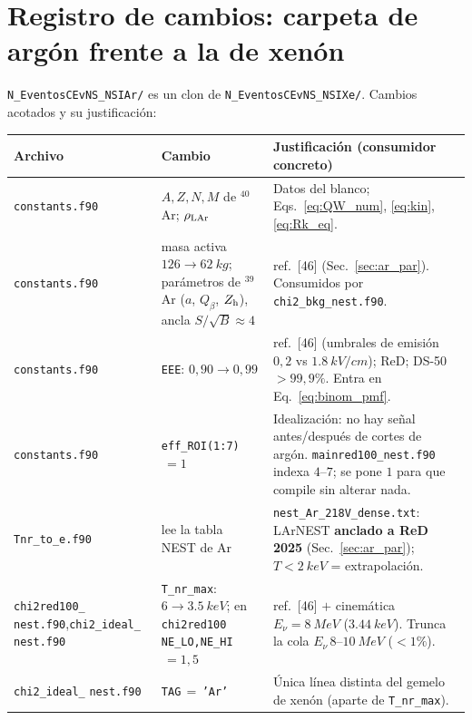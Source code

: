 \documentclass[11pt,a4paper]{article}
\newcommand{\Enu}{E_{\nu}}
\newcommand{\Tnr}{T}
\newcommand{\code}[1]{\texttt{#1}}
\begin{document}
\section{Registro de cambios: carpeta de arg\'on frente a la de xen\'on}
\label{sec:changelog}

\code{N\_EventosCEvNS\_NSIAr/} es un clon de \code{N\_EventosCEvNS\_NSIXe/}.
Cambios acotados y su justificaci\'on:

\begin{center}
\footnotesize
\renewcommand{\arraystretch}{1.3}
\begin{tabular}{@{}>{\raggedright\arraybackslash}p{3.1cm}
                   >{\raggedright\arraybackslash}p{3.5cm}
                   >{\raggedright\arraybackslash}p{7.6cm}@{}}
\toprule
Archivo & Cambio & Justificaci\'on (consumidor concreto) \\
\midrule
\code{constants.f90} & $A,Z,N,M$ de $^{40}$Ar; $\rho_{\rm LAr}$ &
  Datos del blanco; Eqs.~\eqref{eq:QW_num}, \eqref{eq:kin}, \eqref{eq:Rk_eq}. \\
\code{constants.f90} & masa activa $126\to\SI{62}{kg}$; par\'ametros de $^{39}$Ar
  ($a$, $Q_{\beta}$, $Z_{\rm h}$), ancla $S/\sqrt{B}\approx4$ &
  ref.\ [46] (Sec.~\ref{sec:ar_par}). Consumidos por \code{chi2\_bkg\_nest.f90}. \\
\code{constants.f90} & \code{EEE}: $0{,}90\to 0{,}99$ &
  ref.\ [46] (umbrales de emisi\'on $0{,}2$ vs $\SI{1.8}{kV/cm}$); ReD; DS-50
  $>99{,}9\%$. Entra en Eq.~\eqref{eq:binom_pmf}. \\
\code{constants.f90} & \code{eff\_ROI(1:7)}$\,=1$ &
  Idealizaci\'on: no hay se\~nal antes/despu\'es de cortes de arg\'on. \code{mainred100\_nest.f90}
  indexa $4$--$7$; se pone $1$ para que compile sin alterar nada. \\
\code{Tnr\_to\_e.f90} & lee la tabla NEST de Ar &
  \code{nest\_Ar\_218V\_dense.txt}: LArNEST \textbf{anclado a ReD 2025}
  (Sec.~\ref{sec:ar_par}); $\Tnr<\SI{2}{keV}$ = extrapolaci\'on. \\
\code{chi2red100\_} \code{nest.f90},\newline\code{chi2\_ideal\_} \code{nest.f90} &
  \code{T\_nr\_max}: $6\to\SI{3.5}{keV}$; en \code{chi2red100}
  \code{NE\_LO,NE\_HI}$\,=1,5$ & ref.\ [46] $+$ cinem\'atica $\Enu=\SI{8}{MeV}$
  ($\SI{3.44}{keV}$). Trunca la cola $\Enu\,8$--$\SI{10}{MeV}$ ($<1\%$). \\
\code{chi2\_ideal\_} \code{nest.f90} & \code{TAG}$\,=\,$\code{'Ar'} &
  \'Unica l\'inea distinta del gemelo de xen\'on (aparte de \code{T\_nr\_max}). \\

\end{tabular}
\end{center}
\end{document}
